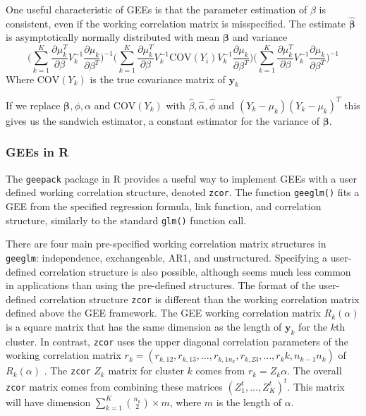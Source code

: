 \documentclass[12pt]{article}
\begin{document}
One useful characteristic of GEEs is that the parameter estimation of $\beta$ is consistent, even if the working correlation matrix is misspecified. The estimate $\hat{\boldsymbol\beta}$ is asymptotically normally distributed with mean $\boldsymbol\beta$ and variance
$$ \big(\sum_{k=1}^K  \frac{\partial  \mu_k^T }{\partial \beta } V_k^{-1} \frac{\partial  \mu_k }{\partial \beta^T } \big)^{-1} \bigg(\sum_{k=1}^K  \frac{\partial  \mu_k^T }{\partial \beta } V_k^{-1}\text{COV}(Y_i)V_{k}^{-1}  \frac{\partial  \mu_k }{\partial \beta^T } \bigg)\big(\sum_{k=1}^K  \frac{\partial  \mu_k^T }{\partial \beta } V_k^{-1} \frac{\partial  \mu_k }{\partial \beta^T } \big)^{-1}$$
Where $\text{COV}(Y_k)$ is the true covariance matrix of $\mathbf{y}_k$

If we replace $ \boldsymbol\beta, \phi, \alpha$ and $\text{COV}(Y_k)$ with $\hat\beta, \hat \alpha, \hat \phi$ and $(Y_k - \mu_k)(Y_k- \mu_k)^T$ this gives us the sandwich estimator, a constant estimator for the variance of $\boldsymbol\beta$.


\subsubsection{GEEs in R}

The \texttt{geepack} package\cite{geepack} in R \cite{R} provides a useful way to implement GEEs with a user defined working correlation structure, denoted \texttt{zcor}. The function \texttt{geeglm()} fits a GEE from the specified regression formula, link function, and correlation structure, similarly to the standard \texttt{glm()} function call.

There are four main pre-specified working correlation matrix structures in \texttt{geeglm}: independence, exchangeable, AR1, and unstructured. Specifying a user-defined correlation structure is also possible, although seems much less common in applications than using the pre-defined structures. The format of the user-defined correlation structure \texttt{zcor} is different than the working correlation matrix defined above the GEE framework. The GEE working correlation matrix $R_k(\alpha)$ is a square matrix that has the same dimension as the length of $\mathbf{y}_k$ for the $k$th cluster. In contrast, \texttt{zcor} uses the upper diagonal correlation parameters of the working correlation matrix $r_k = (r_{k, 12}, r_{k,13}, \ldots , r_{k,1n_k}, r_{k,23}, \ldots , r_k{k,n_{k-1}n_k})$ of $R_{k}(\alpha)$ . The \texttt{zcor} $Z_k$ matrix for cluster $k$ comes from $r_k = Z_k \alpha$. The overall \texttt{zcor} matrix comes from combining these matrices $(Z_1^t, \ldots , Z_K^t)^t$. This matrix will have dimension $\sum_{k=1}^K \binom{n_k}{2} \times m$, where $m$ is the length of $\alpha$.
\end{document}
